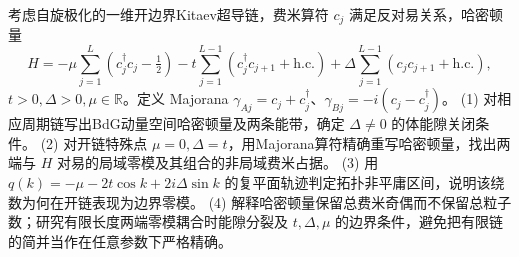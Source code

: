 考虑自旋极化的一维开边界Kitaev超导链，费米算符 \(c_j\) 满足反对易关系，哈密顿量
\[
H=-\mu\sum_{j=1}^L(c_j^\dagger c_j-\tfrac12)
-t\sum_{j=1}^{L-1}(c_j^\dagger c_{j+1}+\mathrm{h.c.})
+\Delta\sum_{j=1}^{L-1}(c_jc_{j+1}+\mathrm{h.c.}),
\]
\(t>0,\Delta>0,\mu\in\mathbb R\)。定义 Majorana \(\gamma_{Aj}=c_j+c_j^\dagger\)、\(\gamma_{Bj}=-i(c_j-c_j^\dagger)\)。
(1) 对相应周期链写出BdG动量空间哈密顿量及两条能带，确定 \(\Delta\ne0\) 的体能隙关闭条件。
(2) 对开链特殊点 \(\mu=0,\Delta=t\)，用Majorana算符精确重写哈密顿量，找出两端与 \(H\) 对易的局域零模及其组合的非局域费米占据。
(3) 用 \(q(k)=-\mu-2t\cos k+2i\Delta\sin k\) 的复平面轨迹判定拓扑非平庸区间，说明该绕数为何在开链表现为边界零模。
(4) 解释哈密顿量保留总费米奇偶而不保留总粒子数；研究有限长度两端零模耦合时能隙分裂及 \(t,\Delta,\mu\) 的边界条件，避免把有限链的简并当作在任意参数下严格精确。
